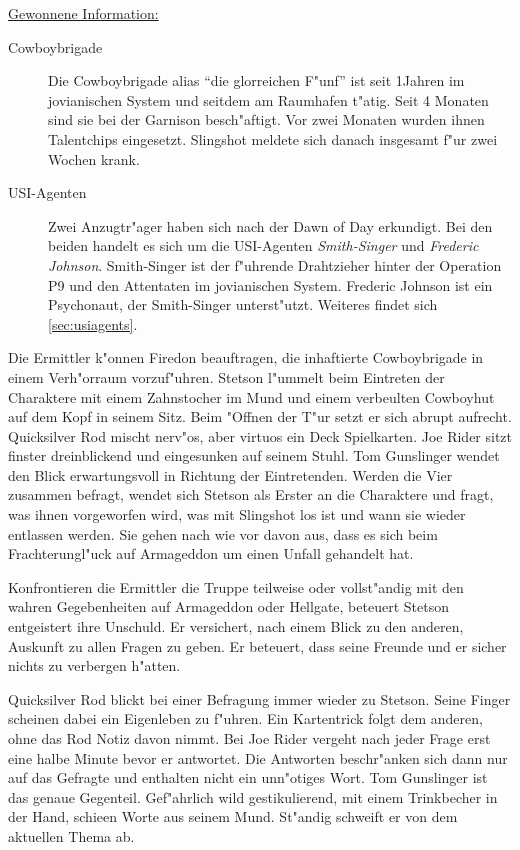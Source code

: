 \begin{remarks}
	\underline{Gewonnene Information:}
	
	\begin{description}
		\item[Cowboybrigade] Die Cowboybrigade alias ``die glorreichen F"unf'' ist seit 1\half Jahren im jovianischen System und seitdem am 
			Raumhafen t"atig. Seit 4 Monaten sind sie bei der Garnison besch"aftigt. Vor zwei Monaten wurden ihnen Talentchips eingesetzt. Slingshot meldete sich danach insgesamt f"ur zwei Wochen krank.
		\item[USI-Agenten] Zwei Anzugtr"ager haben sich nach der Dawn of Day erkundigt. Bei den beiden handelt es sich um die USI-Agenten  
			\emph{Smith-Singer} und \emph{Frederic Johnson}. Smith-Singer ist der f"uhrende Drahtzieher hinter der Operation P9 und den Attentaten im jovianischen System. Frederic Johnson ist ein Psychonaut, der Smith-Singer unterst"utzt. Weiteres findet sich \cref{sec:usiagents}.
	\end{description}
\end{remarks}



Die Ermittler k"onnen Firedon beauftragen, die inhaftierte Cowboybrigade in einem Verh"orraum vorzuf"uhren. Stetson l"ummelt beim Eintreten der Charaktere mit einem Zahnstocher im Mund und einem verbeulten Cowboyhut auf dem Kopf in seinem Sitz. Beim "Offnen der T"ur setzt er sich abrupt aufrecht. Quicksilver Rod mischt nerv"os, aber virtuos ein Deck Spielkarten. Joe Rider sitzt finster dreinblickend und eingesunken auf seinem Stuhl. Tom Gunslinger wendet den Blick erwartungsvoll in Richtung der Eintretenden. Werden die Vier zusammen befragt, wendet sich Stetson als Erster an die Charaktere und fragt, was ihnen vorgeworfen wird, was mit Slingshot los ist und wann sie wieder entlassen werden. Sie gehen nach wie vor davon aus, dass es sich beim Frachterungl"uck auf Armageddon um einen Unfall gehandelt hat.

Konfrontieren die Ermittler die Truppe teilweise oder vollst"andig mit den wahren Gegebenheiten auf Armageddon oder Hellgate, beteuert Stetson entgeistert ihre Unschuld. Er versichert, nach einem Blick zu den anderen, Auskunft zu allen Fragen zu geben. Er beteuert, dass seine Freunde und er sicher nichts zu verbergen h"atten.

Quicksilver Rod blickt bei einer Befragung immer wieder zu Stetson. Seine Finger scheinen dabei ein Eigenleben zu f"uhren. Ein Kartentrick folgt dem anderen, ohne das Rod Notiz davon nimmt. Bei Joe Rider vergeht nach jeder Frage erst eine halbe Minute bevor er antwortet. Die Antworten beschr"anken sich dann nur auf das Gefragte und enthalten nicht ein unn"otiges Wort. Tom Gunslinger ist das genaue Gegenteil. Gef"ahrlich wild gestikulierend, mit einem Trinkbecher in der Hand, schie\3en Worte aus seinem Mund. St"andig schweift er von dem aktuellen Thema ab.

